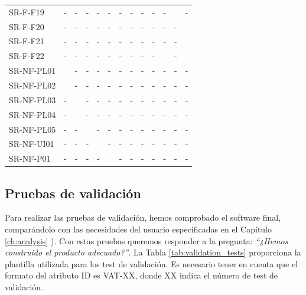 \begin{table}[htbp]
{\begin{tabular}{@{}L{3cm}C{0.7cm}C{0.7cm}C{0.7cm}C{0.7cm}C{0.7cm}C{0.7cm}C{0.7cm}C{0.7cm}C{0.7cm}C{0.7cm}C{0.7cm}C{0.7cm}@{}}
    SR-F-F19 & - & - & - & - & - & - & - & - & - & - &  & - \\
    SR-F-F20 & - & - & - & - & - & - & - & - & - & - & - &  \\
    SR-F-F21 & - & - & - & - & - & - & - & - & - & - & - &  \\
    SR-F-F22 & - & - & - & - & - & - & - & - & - &  & - &  \\
    SR-NF-PL01 &  & - & - & - & - & - & - & - & - & - & - & - \\
    SR-NF-PL02 &  & - & - & - & - & - & - & - & - & - & - & - \\
    SR-NF-PL03 & - &  & - & - & - & - & - & - & - & - & - & - \\
    SR-NF-PL04 & - &  & - & - & - & - & - & - & - & - & - & - \\
    SR-NF-PL05 & - & - &  & - & - & - & - & - & - & - & - & - \\
    SR-NF-UI01 & - & - & - &  & - & - & - & - & - & - & - & - \\
    SR-NF-P01 & - & - & - & - &  & - & - & - & - & - & - & - \\
    \bottomrule
\end{tabular}
}
\label{tab:verification_matrix}
\end{table}    

\clearpage

\subsection{Pruebas de validación}


Para realizar las pruebas de validación, hemos comprobado el \gls{software} final, comparándolo con las necesidades del usuario especificadas en el Capítulo \ref{ch:analysis} \textit{}). Con estas pruebas queremos responder a la pregunta: \emph{``¿Hemos construido el producto adecuado?''}. La Tabla \ref{tab:validation_tests} proporciona la plantilla utilizada para los test de validación. Es necesario tener en cuenta que el formato del atributo ID es VAT-XX, donde XX indica el número de test de validación.



